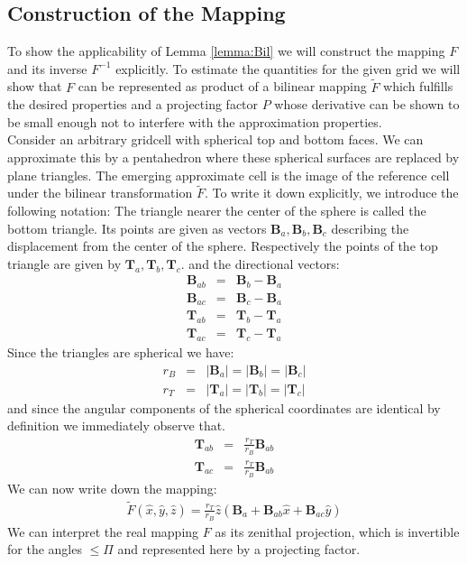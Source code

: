 \documentclass[times]{fldauth}
\newcommand{\mb}{\mathbf}
\newcommand{\lemmaref}[1]{Lemma \ref{#1}}
\begin{document}
\subsection{Construction of the Mapping}
To show the applicability of \lemmaref{lemma:Bil} we will construct  the mapping $F$ and its inverse $F^{-1}$ explicitly. 
To estimate the quantities for the given grid we will show that $F$ can be represented as product of a bilinear mapping $\tilde F$ which fulfills the desired properties and a projecting factor $P$  whose derivative can be shown to be small enough not to interfere with the approximation properties. \\    
Consider an arbitrary gridcell with spherical top and bottom faces. 
We can approximate this by a pentahedron where these spherical surfaces are replaced by plane triangles.
The emerging approximate cell is the image of the reference cell under the bilinear transformation $\tilde F$.
To write it down explicitly, we introduce the following notation:
The triangle nearer the center of the sphere is called the bottom triangle. 
Its points are given as vectors $\mb B_a, \mb B_b,\mb B_c$ describing the displacement from the center of the sphere. Respectively the points of the top triangle are given by $\mb T_a, \mb T_b,\mb T_c$.
 and the directional vectors:
\begin{eqnarray*}
\mb B_{ab}	&=&\mb B_b-\mb B_a %
\\
\mb B_{ac}	&=&\mb B_c-\mb B_a %
\\
\mb T_{ab}	&=&\mb T_b-\mb T_a  
\\
\mb T_{ac}	&=&\mb T_c-\mb T_a  
\end{eqnarray*}
Since the triangles are spherical we have:
\begin{eqnarray*}
r_B	&=&	|\mb B_a|=|\mb B_b|=|\mb B_c| %
\\ 
r_T	&=&	|\mb T_a|=|\mb T_b|=|\mb T_c|
\end{eqnarray*}
and since the angular components of the  spherical coordinates are identical by definition we immediately observe that.
\begin{eqnarray*}
\mb T_{ab}	&=&\frac{r_T}{r_B} \mb B_{ab} 
\\
\mb T_{ac}	&=&\frac{r_T}{r_B} \mb B_{ab} 
\end{eqnarray*}
We can now write down the mapping:
\begin{eqnarray*}
\tilde F(\hat x,\hat y, \hat z)=
\frac{r_T}{r_B} \hat z \left( \mb B_a +\mb B_{ab} \hat x +\mb B_{ac} \hat y \right)
\end{eqnarray*}
We can interpret the real mapping $F$ as its zenithal projection, which is invertible for the angles $\le \Pi$ and represented here by a projecting factor.
\end{document}

